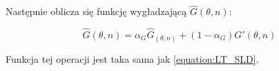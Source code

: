 \noindent Następnie oblicza się funkcję wygładzającą $\widehat{G}(\theta,n)$:

\begin{equation}
    \label{equation:Ghat}
    \widehat{G}(\theta,n)=
    \alpha_{G}\widehat{G}_(\theta,n)
    + (1-\alpha_{G})G'(\theta,n)
\end{equation}


\noindent Funkcja tej operacji jest taka sama jak \ref{equation:LT_SLD}.





